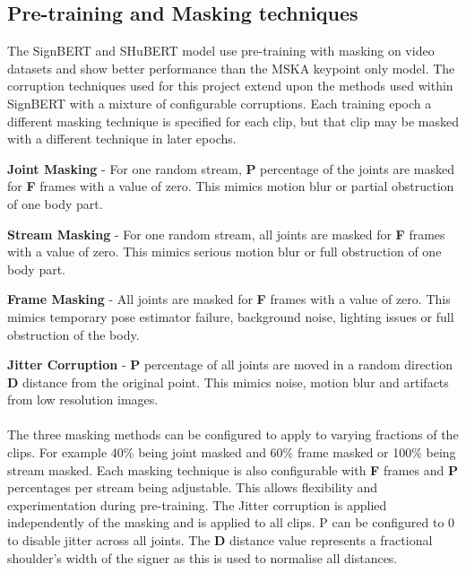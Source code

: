 \documentclass{article}
\begin{document}
\subsection {Pre-training and Masking techniques}
The SignBERT and SHuBERT model use pre-training with masking on video datasets and show better performance than the MSKA keypoint only model. The corruption techniques used for this project extend upon the methods used within SignBERT with a mixture of configurable corruptions. Each training epoch a different masking technique is specified for each clip, but that clip may be masked with a different technique in later epochs. 


\textbf{Joint Masking} - For one random stream, \textbf{P} percentage of the joints are masked for \textbf{F} frames with a value of zero. This mimics motion blur or partial obstruction of one body part.
 
\textbf{Stream Masking} - For one random stream, all joints are masked for \textbf{F} frames with a value of zero. This mimics serious motion blur or full obstruction of one body part.

\textbf{Frame Masking} - All joints are masked for \textbf{F} frames with a value of zero. This mimics temporary pose estimator failure, background noise, lighting issues or full obstruction of the body.

\textbf{Jitter Corruption} - \textbf{P} percentage of all joints are moved in a random direction \textbf{D} distance from the original point. This mimics noise, motion blur and artifacts from low resolution images.
\paragraph{}
 
The three masking methods can be configured to apply to varying fractions of the clips. For example 40\% being joint masked and 60\% frame masked or 100\% being stream masked. Each masking technique is also configurable with \textbf{F} frames and \textbf{P} percentages per stream being adjustable. This allows flexibility and experimentation during pre-training. The Jitter corruption is applied independently of the masking and is applied to all clips. P can be configured to 0 to disable jitter across all joints. The \textbf{D} distance value represents a fractional shoulder's width of the signer as this is used to normalise all distances. 
\end{document}
